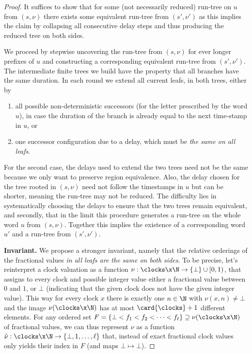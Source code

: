 \begin{proof}
    It suffices to show that for some (not necessarily reduced) run-tree on $u$ from $(s,\nu)$
    there exists some equivalent run-tree from $(s',\nu')$ as this implies the claim by collapsing all consecutive delay steps and thus producing the reduced tree on both sides.

    We proceed by stepwise uncovering the run-tree from $(s,\nu)$
    for ever longer prefixes of $u$
    and constructing a corresponding equivalent run-tree from $(s',\nu')$.
    The intermediate finite trees we build have the property that all branches have the same duration.
    In each round we extend all current leafs, in both trees, either by
    \begin{enumerate}
        \item all possible non-deterministic successors (for the letter prescribed by the word $u$),
    in case the duration of the branch is already equal to the next time-stamp in $u$, or
\item one successor configuration due to a delay, which must be \emph{the same on all leafs}.
    \end{enumerate}
    For the second case, the delays used to extend the two trees need not be the same
    because we only want to preserve region equivalence.
    Also, the delay chosen for the tree rooted in $(s,\nu)$ need not follow the
    timestamps in $u$ but can be shorter, meaning the run-tree may not be reduced.
    The difficulty lies in systematically choosing the delays to ensure that the two trees remain equivalent, and secondly, that in the limit this procedure generates a run-tree on the whole word $u$ from $(s,\nu)$.
    Together this implies the existence of a corresponding word $u'$ and a run-tree from $(s',\nu')$.
    
    \medskip
    \textbf{Invariant.}
    We propose a stronger invariant, namely that the relative orderings of the fractional values
    \emph{in all leafs are the same on both sides}.
    To be precise, 
    let's reinterpret a clock valuation as a function $\nu:\clocks\x\N\to\{\bot\}\cup[0,1)$,
    that assigns to every clock and possible integer value either a fractional value between $0$ and $1$,
    or $\bot$ (indicating that the given clock does not have the given integer value). 
    This way for every clock $x$ there is exactly one $n\in\N$ with $\nu(x,n)\neq\bot$
    and the image $\nu(\clocks\x\N)$ has at most $\card{\clocks}+1$ different elements.
    For any ordered set $F=\{\bot<f_1<f_2<\cdots<f_\ell\}\supseteq\nu(\clocks\x\N)$ of fractional values, we can thus represent $\nu$
    as a function $\hat{\nu}:\clocks\x\N\to \{\bot,1,\ldots, \ell\}$ that, instead of exact fractional clock values only yields their index in $F$ (and maps $\bot\mapsto\bot$).


\end{proof}

